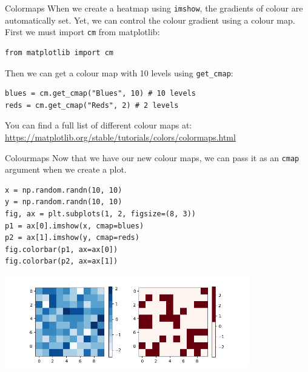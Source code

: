\documentclass[10pt]{beamer}
\begin{document}
\begin{frame}[label={sec:org4e48afd},fragile]{Colormaps}
 When we create a heatmap using \texttt{imshow}, the gradients of colour are automatically
set. Yet, we can control the colour gradient using a colour map. First we must
import \texttt{cm} from matplotlib:

\begin{verbatim}
from matplotlib import cm
\end{verbatim}

Then we can get a colour map with 10 levels using \texttt{get\_cmap}:

\begin{verbatim}
blues = cm.get_cmap("Blues", 10) # 10 levels
reds = cm.get_cmap("Reds", 2) # 2 levels
\end{verbatim}

You can find a full list of different colour maps at: \url{https://matplotlib.org/stable/tutorials/colors/colormaps.html}
\end{frame}

\begin{frame}[label={sec:orgf4397ee},fragile]{Colourmaps}
 Now that we have our new colour maps, we can pass it as an \texttt{cmap} argument when we
create a plot.

\begin{verbatim}
x = np.random.randn(10, 10)
y = np.random.randn(10, 10)
fig, ax = plt.subplots(1, 2, figsize=(8, 3))
p1 = ax[0].imshow(x, cmap=blues)
p2 = ax[1].imshow(y, cmap=reds)
fig.colorbar(p1, ax=ax[0])
fig.colorbar(p2, ax=ax[1])
\end{verbatim}

\begin{center}
\includegraphics[width=0.8\textwidth]{images/colourmaps.png}
\end{center}
\end{frame}
\end{document}
